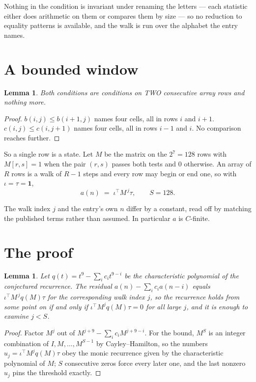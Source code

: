 \documentclass[11pt,a4paper]{article}
\theoremstyle{plain}
\newtheorem{lemma}[theorem]{Lemma}
\theoremstyle{definition}
\begin{document}
Nothing in the condition is invariant under renaming the letters --- each statistic either does
arithmetic on them or compares them by size --- so no reduction to equality patterns is
available, and the walk is run over the alphabet the entry names.

\section{A bounded window}

\begin{lemma}\label{lem:win}
Both conditions are conditions on TWO consecutive array rows and nothing more.
\end{lemma}

\begin{proof}
$b(i,j)\le b(i{+}1,j)$ names four cells, all in rows $i$ and $i+1$. $c(i,j)\le c(i,j{+}1)$
names four cells, all in rows $i-1$ and $i$. No comparison reaches further.
\end{proof}

So a single row is a state. Let $M$ be the matrix on the $2^{7}=128$ rows with
$M[r,s]=1$ when the pair $(r,s)$ passes both tests and $0$ otherwise. An array of $R$ rows is a
walk of $R-1$ steps and every row may begin or end one, so with $\iota=\tau=\mathbf{1}$,
\[
a(n)\;=\;\iota^{\!\top}M^{\,j}\tau ,\qquad S=128.
\]

The walk index $j$ and the entry's own $n$ differ by a constant, read off by matching the
published terms rather than assumed. In particular $a$ is $C$-finite.

\section{The proof}

\begin{lemma}\label{lem:crit}
Let $q(t)=t^{9}-\sum_i c_it^{9-i}$ be the characteristic polynomial of the
conjectured recurrence. The residual $a(n)-\sum_ic_ia(n-i)$ equals
$\iota^{\!\top}M^{\,j}q(M)\tau$ for the corresponding walk index $j$, so the recurrence
holds from some point on if and only if $\iota^{\!\top}M^{j}q(M)\tau=0$ for all large $j$,
and it is enough to examine $j<S$.
\end{lemma}

\begin{proof}
Factor $M^{j}$ out of $M^{j+9}-\sum_ic_iM^{j+9-i}$. For the bound, $M^{S}$
is an integer combination of $I,M,\dots,M^{S-1}$ by Cayley--Hamilton, so the numbers
$u_j=\iota^{\!\top}M^{j}q(M)\tau$ obey the monic recurrence given by the characteristic
polynomial of $M$; $S$ consecutive zeros force every later one, and the last nonzero $u_j$
pins the threshold exactly.
\end{proof}
\end{document}
